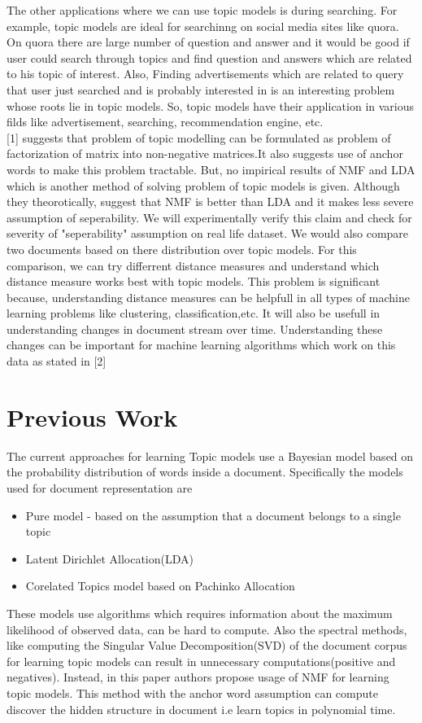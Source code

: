 \documentclass[a4paper,11pt]{article}
\begin{document}
The other applications where we can use topic models is during searching. For example, topic models are ideal for searchinng on social media sites like quora. On quora there are large number of question and answer and it would be good if user could search through topics and find question and answers which are related to his topic of interest. Also, Finding advertisements which are related to query that user just searched and is probably interested in is an interesting problem whose roots lie in topic models. So, topic models have their application in various filds like advertisement, searching, recommendation engine, etc. \\

[1] suggests that problem of topic modelling can be formulated as problem of factorization of matrix into non-negative matrices.It also suggests use of anchor words to make this problem tractable. But, no impirical results of NMF and LDA which is another method of solving problem of topic models is given. Although they theorotically, suggest that NMF is better than LDA and it makes less severe assumption of seperability. We will experimentally verify this claim and check for severity of "seperability" assumption on real life dataset. We would also compare two documents based on there distribution over topic models. For this comparison, we can try differrent distance measures and understand which distance measure works best with topic models. This problem is significant because, understanding distance measures can be helpfull in all types of machine learning problems like clustering, classification,etc. It will also be usefull in understanding changes in document stream over time. Understanding these changes can be important for machine learning algorithms which work on this data as stated in [2]

\section{Previous Work}

The current approaches for learning Topic models use a Bayesian model based on the probability distribution of words inside a document. Specifically the models used for document representation are

\begin{itemize} 
\item Pure model - based on the assumption that a document belongs to a single topic
\item Latent Dirichlet Allocation(LDA)
\item Corelated Topics model based on Pachinko Allocation
\end{itemize}
These models use algorithms which requires information about the maximum likelihood of observed data, can be hard to compute. Also the spectral methods, like computing the Singular Value Decomposition(SVD) of the document corpus for learning topic models can result in unnecessary computations(positive and negatives). Instead, in this paper authors propose usage of NMF for learning topic models. This method with the anchor word assumption can compute discover the hidden structure in document i.e learn topics in polynomial time. 
\end{document}
